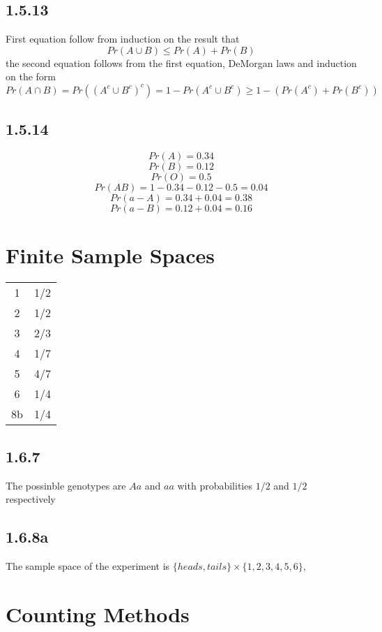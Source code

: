 \documentclass[11pt,oneside,titlepage]{book}
\begin{document}
\subsection*{1.5.13}

First equation follow from induction on the result that
$$Pr(A \cup B) \leq Pr(A) + Pr(B)$$
the second equation follows from the first equation, DeMorgan laws and induction on the
form 
$$Pr(A \cap B) = Pr((A^c \cup B^c)^c) = 1 - Pr(A^c \cup B^c) \geq 1 - (Pr(A^c) + Pr(B^c))$$

\subsection*{1.5.14}

$$Pr(A) = 0.34$$
$$Pr(B) = 0.12$$
$$Pr(O) = 0.5$$
$$Pr(AB) = 1 - 0.34 - 0.12 - 0.5 = 0.04$$
$$Pr(a-A) = 0.34 + 0.04 = 0.38$$
$$Pr(a-B) = 0.12 + 0.04 = 0.16$$

\section{Finite Sample Spaces}

\begin{tabular}[center]{||c | c|| }
  \hline
  1 & 1/2 \\
  2 & 1/2 \\
  3 & 2/3 \\
  4 & 1/7 \\
  5 & 4/7 \\
  6 & 1/4 \\
  8b & 1/4 \\
  \hline 
\end{tabular}

\subsection*{1.6.7}

The possinble genotypes are $Aa$ and $aa$ with probabilities $1/2$ and $1/2$ respectively

\subsection*{1.6.8a}

The sample space of the experiment is $\{heads, tails\} \times \{1, 2, 3, 4, 5, 6\}$,

\section{Counting Methods}
\end{document}
